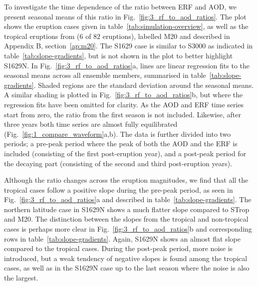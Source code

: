\documentclass[draft]{agujournal2019}
\begin{document}
  To investigate the time dependence of the ratio between ERF and AOD, we present
  seasonal means of this ratio in Fig.~\ref{fig:3_rf_to_aod_ratios}. The plot shows the
  eruption cases given in table~\ref{tab:simulation-overview}, as well as the tropical
  eruptions from  (\(6\) of \(82\) eruptions), labelled M20
  and described in Appendix B, section~\ref{ap:m20}. The S1629 case is similar to S3000
  as indicated in table~\ref{tab:slope-gradients}, but is not shown in the plot to
  better highlight S1629N. In Fig.~\ref{fig:3_rf_to_aod_ratios}a, lines are linear
  regression fits to the seasonal means across all ensemble members, summarised in
  table~\ref{tab:slope-gradients}. Shaded regions are the standard deviation around the
  seasonal means. A similar shading is plotted in Fig.~\ref{fig:3_rf_to_aod_ratios}b,
  but where the regression fits have been omitted for clarity. As the AOD and ERF time
  series start from zero, the ratio from the first season is not included. Likewise,
  after three years both time series are almost fully equilibrated
  (Fig.~\ref{fig:1_compare_waveform}a,b). The data is further divided into two periods;
  a pre-peak period where the peak of both the AOD and the ERF is included (consisting
  of the first post-eruption year), and a post-peak period for the decaying part
  (consisting of the second and third post-eruption years).

  Although the ratio changes across the eruption magnitudes, we find that all the
  tropical cases follow a positive slope during the pre-peak period, as seen in
  Fig.~\ref{fig:3_rf_to_aod_ratios}a and described in table~\ref{tab:slope-gradients}.
  The northern latitude case in S1629N shows a much flatter slope compared to STrop and
  M20. The distinction between the slopes from the tropical and non-tropical cases is
  perhaps more clear in Fig.~\ref{fig:3_rf_to_aod_ratios}b and corresponding rows in
  table~\ref{tab:slope-gradients}. Again, S1629N shows an almost flat slope compared to
  the tropical cases. During the post-peak period, more noise is introduced, but a weak
  tendency of negative slopes is found among the tropical cases, as well as in the
  S1629N case up to the last season where the noise is also the largest.
\end{document}
